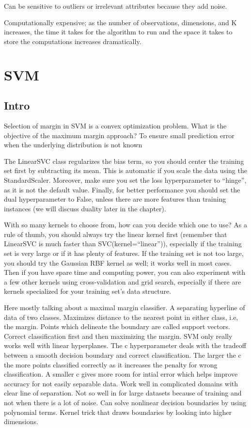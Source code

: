 \documentclass[]{book}
\theoremstyle{definition}
\theoremstyle{definition}
\theoremstyle{definition}
\theoremstyle{remark}
\begin{document}
Can be sensitive to outliers or irrelevant attributes because they add
noise.

Computationally expensive; as the number of observations, dimensions,
and K increases, the time it takes for the algorithm to run and the
space it takes to store the computations increases dramatically.

\section{SVM}\label{svm}

\subsection{Intro}\label{intro-12}

Selection of margin in SVM is a convex optimization problem. What is the
objective of the maximum margin approach? To ensure small prediction
error when the underlying distribution is not known

The LinearSVC class regularizes the bias term, so you should center the
training set first by subtracting its mean. This is automatic if you
scale the data using the StandardScaler. Moreover, make sure you set the
loss hyperparameter to ``hinge'', as it is not the default value.
Finally, for better performance you should set the dual hyperparameter
to False, unless there are more features than training instances (we
will discuss duality later in the chapter).

With so many kernels to choose from, how can you decide which one to
use? As a rule of thumb, you should always try the linear kernel first
(remember that LinearSVC is much faster than SVC(kernel=``linear'')),
especially if the training set is very large or if it has plenty of
features. If the training set is not too large, you should try the
Gaussian RBF kernel as well; it works well in most cases. Then if you
have spare time and computing power, you can also experiment with a few
other kernels using cross-validation and grid search, especially if
there are kernels specialized for your training set's data structure.

Here mostly talking about a maximal margin classifier. A separating
hyperline of data of two classes. Maximizes distance to the nearest
point in either class, i.e, the margin. Points which delineate the
boundary are called support vectors. Correct classification first and
then maximizing the margin. SVM only really works well with linear
hyperplanes. The c hyperparameter deals with the tradeoff between a
smooth decision boundary and correct classification. The larger the c
the more points classified correctly as it increases the penalty for
wrong classification. A smaller c gives more room for intial error which
helps improve accuracy for not easily separable data. Work well in
complicated domains with clear line of separation. Not so well in for
large datasets because of training and not when there is a lot of noise.
Can solve nonlinear decision boundaries by using polynomial terms.
Kernel trick that draws boundaries by looking into higher dimensions.
\end{document}

